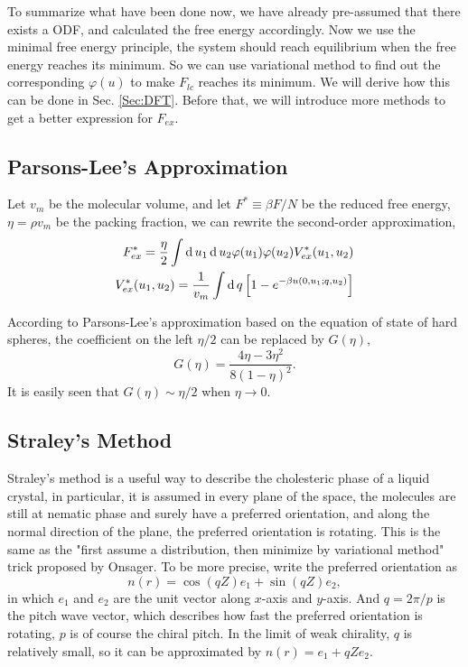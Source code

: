 To summarize what have been done now, we have already pre-assumed that there exists a ODF, and calculated the free energy accordingly. Now we use the minimal free energy principle, the system should reach equilibrium when the free energy reaches its minimum. So we can use variational method to find out the corresponding $\varphi(u)$ to make $F_{lc}$ reaches its minimum. We will derive how this can be done in Sec. \ref{Sec:DFT}. Before that, we will introduce more methods to get a better expression for $F_{ex}$.

\subsection{Parsons-Lee's Approximation}
Let $v_m$ be the molecular volume, and let $F^*\equiv\beta F/N$ be the reduced free energy, $\eta = \rho v_m$ be the packing fraction, we can rewrite the second-order approximation,
\begin{equation}
	\begin{split}
		F_{ex}^* = \frac{\eta}{2}\int \operatorname{d}u_1\operatorname{d}u_2\varphi(u_1)\varphi(u_2)V_{ex}^*(u_1,u_2)\\
		V_{ex}^*(u_1,u_2) = \frac{1}{v_m}\int\operatorname{d}q\left[1-e^{-\beta u(0,u_1;q,u_2)}\right]
	\end{split}
\end{equation}

According to Parsons-Lee's approximation based on the equation of state of hard spheres, the coefficient on the left $\eta/2$ can be replaced by $G(\eta)$,
\begin{equation}
	G(\eta)=\dfrac{4\eta-3\eta^2}{8(1-\eta)^2}.
\end{equation}
It is easily seen that $G(\eta)\sim\eta/2$ when $\eta\rightarrow 0$.


\subsection{Straley's Method}
Straley's method is a useful way to describe the cholesteric phase of a liquid crystal, in particular, it is assumed in every plane of the space, the molecules are still at nematic phase and surely have a preferred orientation, and along the normal direction of the plane, the preferred orientation is rotating. This is the same as the "first assume a distribution, then minimize by variational method" trick proposed by Onsager. To be more precise, write the preferred orientation as
\begin{equation}
	n(r)=\cos(qZ)e_1 + \sin(qZ)e_2,
\end{equation}
in which $e_1$ and $e_2$ are the unit vector along $x$-axis and $y$-axis. And $q=2\pi/p$ is the pitch wave vector, which describes how fast the preferred orientation is rotating, $p$ is of course the chiral pitch. In the limit of weak chirality, $q$ is relatively small, so it can be approximated by $n(r)=e_1+qZe_2$.

